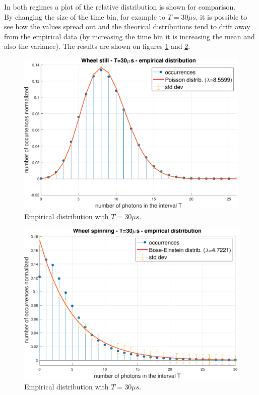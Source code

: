 In both regimes a plot of the relative distribution is shown for comparison. \\

By changing the size of the time bin, for example to $T=30\mu s$, it is possible to see how the values spread out and the theorical distributions tend to drift away from the empirical data (by increasing the time bin it is increasing the mean and also the variance). The results are shown on figures \ref{fig:still30} and \ref{fig:spinning30}.
\begin{figure}[H]
    \centering
    \includegraphics[width=.8\textwidth]{images/Still_Wheel_30.pdf}
    \caption{Empirical distribution with $T=30\mu s$.}
    \label{fig:still30}    
\end{figure}
\begin{figure}[H]
    \centering
    \includegraphics[width=.8\textwidth]{images/Spinning_Wheel_30.pdf}
    \caption{Empirical distribution with $T=30\mu s$.}
    \label{fig:spinning30}    
\end{figure}